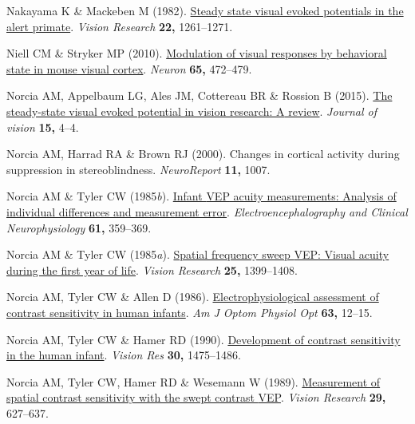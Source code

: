 \documentclass[
  letterpaper,
  DIV=11,
  numbers=noendperiod]{scrartcl}
\newlength{\cslhangindent}
\newenvironment{CSLReferences}[2] %
 {\begin{list}{}{%
  \setlength{\itemindent}{0pt}
  \setlength{\leftmargin}{0pt}
  \setlength{\parsep}{0pt}
  \ifodd #1
   \setlength{\leftmargin}{\cslhangindent}
   \setlength{\itemindent}{-1\cslhangindent}
  \fi
  \setlength{\itemsep}{#2\baselineskip}}}
 {\end{list}}
\begin{document}
\begin{CSLReferences}{1}{1}
Nakayama K \& Mackeben M (1982).
\href{https://doi.org/10.1016/0042-6989(82)90138-9}{Steady state visual
evoked potentials in the alert primate}. \emph{Vision Research}
\textbf{22,} 1261--1271.

Niell CM \& Stryker MP (2010).
\href{https://doi.org/10.1016/j.neuron.2010.01.033}{Modulation of visual
responses by behavioral state in mouse visual cortex}. \emph{Neuron}
\textbf{65,} 472--479.

Norcia AM, Appelbaum LG, Ales JM, Cottereau BR \& Rossion B (2015).
\href{https://doi.org/10.1167/15.6.4}{The steady-state visual evoked
potential in vision research: {A} review}. \emph{Journal of vision}
\textbf{15,} 4--4.

Norcia AM, Harrad RA \& Brown RJ (2000). Changes in cortical activity
during suppression in stereoblindness. \emph{NeuroReport} \textbf{11,}
1007.

Norcia AM \& Tyler CW (1985\emph{b}).
\href{https://doi.org/10.1016/0013-4694(85)91026-0}{Infant {VEP} acuity
measurements: Analysis of individual differences and measurement error}.
\emph{Electroencephalography and Clinical Neurophysiology} \textbf{61,}
359--369.

Norcia AM \& Tyler CW (1985\emph{a}).
\href{https://doi.org/10.1016/0042-6989(85)90217-2}{Spatial frequency
sweep {VEP}: Visual acuity during the first year of life}. \emph{Vision
Research} \textbf{25,} 1399--1408.

Norcia AM, Tyler CW \& Allen D (1986).
\href{https://doi.org/10.1097/00006324-198601000-00003}{Electrophysiological
assessment of contrast sensitivity in human infants}. \emph{Am J Optom
Physiol Opt} \textbf{63,} 12--15.

Norcia AM, Tyler CW \& Hamer RD (1990).
\href{https://doi.org/10.1016/0042-6989(90)90028-j}{Development of
contrast sensitivity in the human infant}. \emph{Vision Res}
\textbf{30,} 1475--1486.

Norcia AM, Tyler CW, Hamer RD \& Wesemann W (1989).
\href{https://doi.org/10.1016/0042-6989(89)90048-5}{Measurement of
spatial contrast sensitivity with the swept contrast {VEP}}.
\emph{Vision Research} \textbf{29,} 627--637.


\end{CSLReferences}
\end{document}
